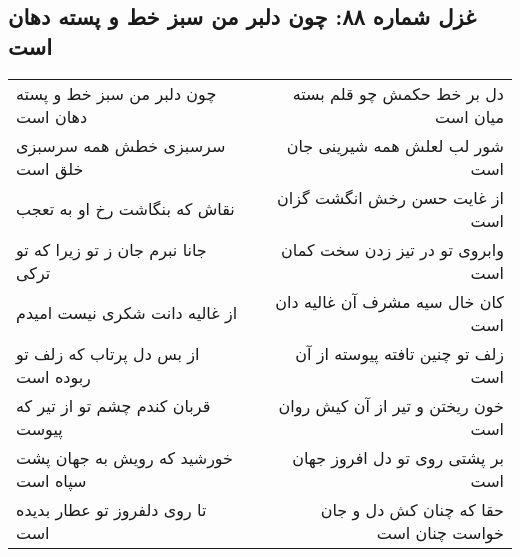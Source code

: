 \begin{center}
\section*{غزل شماره ۸۸: چون دلبر من سبز خط و پسته دهان است}
\label{sec:088}
\begin{longtable}{l p{0.5cm} r}
چون دلبر من سبز خط و پسته دهان است
&&
دل بر خط حکمش چو قلم بسته میان است
\\
سرسبزی خطش همه سرسبزی خلق است
&&
شور لب لعلش همه شیرینی جان است
\\
نقاش که بنگاشت رخ او به تعجب
&&
از غایت حسن رخش انگشت گزان است
\\
جانا نبرم جان ز تو زیرا که تو ترکی
&&
وابروی تو در تیز زدن سخت کمان است
\\
از غالیه دانت شکری نیست امیدم
&&
کان خال سیه مشرف آن غالیه دان است
\\
از بس دل پرتاب که زلف تو ربوده است
&&
زلف تو چنین تافته پیوسته از آن است
\\
قربان کندم چشم تو از تیر که پیوست
&&
خون ریختن و تیر از آن کیش روان است
\\
خورشید که رویش به جهان پشت سپاه است
&&
بر پشتی روی تو دل افروز جهان است
\\
تا روی دلفروز تو عطار بدیده است
&&
حقا که چنان کش دل و جان خواست چنان است
\\
\end{longtable}
\end{center}
